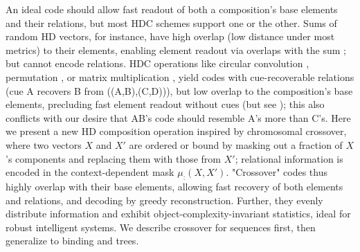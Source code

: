\documentclass{article}
\begin{document}
An ideal code should allow fast readout of both a composition's base elements and their relations, but most HDC schemes support one or the other. Sums of random HD vectors, for instance, have high overlap (low distance under most metrics) to their elements, enabling element readout via overlaps with the sum \cite{Bloom:1970, Anderson:1973, Plate:1994}; but cannot encode relations. HDC operations like circular convolution \cite{Plate:1995}, permutation \cite{Gayler:1998, Sahlgren:2008}, or matrix multiplication \cite{Gosmann:2019}, yield codes with cue-recoverable relations (cue A recovers B from ((A,B),(C,D))), but low overlap to the composition's base elements, precluding fast element readout without cues (but see \cite{Rachkovskij:2001}); this also conflicts with our desire that AB's code should resemble A's more than C's. Here we present a new HD composition operation inspired by chromosomal crossover, where two vectors $X$ and $X'$ are ordered or bound by masking out a fraction of $X$'s components and replacing them with those from $X'$; relational information is encoded in the context-dependent mask $\mu_:(X, X')$. "Crossover" codes thus highly overlap with their base elements, allowing fast recovery of both elements and relations, and decoding by greedy reconstruction. Further, they evenly distribute information and exhibit object-complexity-invariant statistics, ideal for robust intelligent systems. We describe crossover for sequences first, then generalize to binding and trees.

\end{document}
